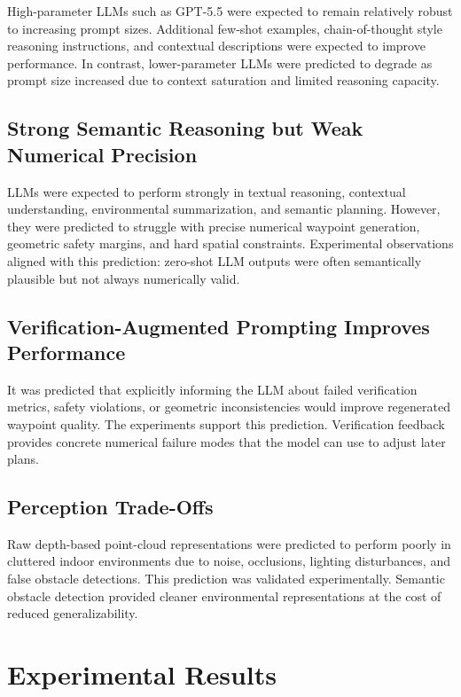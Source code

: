 \documentclass[11pt]{article}
\begin{document}
High-parameter LLMs such as GPT-5.5 were expected to remain relatively robust to increasing prompt sizes. Additional few-shot examples, chain-of-thought style reasoning instructions, and contextual descriptions were expected to improve performance. In contrast, lower-parameter LLMs were predicted to degrade as prompt size increased due to context saturation and limited reasoning capacity.

\subsection{Strong Semantic Reasoning but Weak Numerical Precision}

LLMs were expected to perform strongly in textual reasoning, contextual understanding, environmental summarization, and semantic planning. However, they were predicted to struggle with precise numerical waypoint generation, geometric safety margins, and hard spatial constraints. Experimental observations aligned with this prediction: zero-shot LLM outputs were often semantically plausible but not always numerically valid.

\subsection{Verification-Augmented Prompting Improves Performance}

It was predicted that explicitly informing the LLM about failed verification metrics, safety violations, or geometric inconsistencies would improve regenerated waypoint quality. The experiments support this prediction. Verification feedback provides concrete numerical failure modes that the model can use to adjust later plans.

\subsection{Perception Trade-Offs}

Raw depth-based point-cloud representations were predicted to perform poorly in cluttered indoor environments due to noise, occlusions, lighting disturbances, and false obstacle detections. This prediction was validated experimentally. Semantic obstacle detection provided cleaner environmental representations at the cost of reduced generalizability.

\section{Experimental Results}
\end{document}
